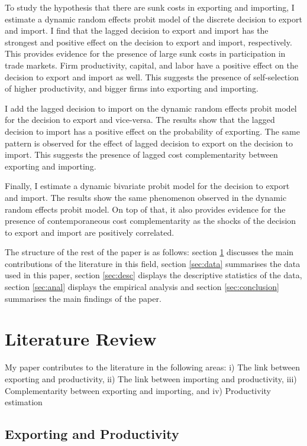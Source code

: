 \documentclass[12pt]{article}
\begin{document}
To study the hypothesis that there are  sunk costs in exporting
and importing, I estimate a dynamic random effects probit model of the discrete
decision to export and import. I find that the lagged decision to
export and import has the
 strongest and positive effect on the decision to export and
import, respectively.  This provides evidence for the presence of
large sunk costs in participation in trade markets. Firm productivity,
capital, and labor have a positive
effect on the decision to export and import as well. This suggests the
presence of self-selection of higher productivity, and bigger firms into exporting
and importing. 

I add the lagged decision to import on the dynamic random effects
probit model for the decision to export and vice-versa. The results show that the lagged
decision to import has a positive effect on the probability of
exporting. The same pattern is observed for the effect of lagged
decision to export on the decision to import. This suggests the
presence of lagged cost complementarity between exporting and
importing. 

Finally, I estimate a dynamic bivariate probit model for the decision to export
and import. The results show the same phenomenon observed in the
dynamic random effects probit model. On top of that, it also provides
evidence for the presence
of contemporaneous cost complementarity as the shocks of the decision
to export and import are positively correlated. 


The structure of the rest of the paper is as follows: section \ref{sec:lit} discusses
the main contributions of the literature in this field, section
\ref{sec:data} summarises the data used in this paper, section
\ref{sec:desc} displays the descriptive statistics of the data,
section \ref{sec:anal} displays the empirical analysis and section 
\ref{sec:conclusion} summarises the main findings of the paper. 


\section{Literature Review}\label{sec:lit}
My paper contributes to the literature in the following areas: 
i) The link between exporting and productivity,
ii) The link between importing and productivity, 
iii) Complementarity between exporting and importing,
and iv) Productivity estimation
\subsection*{Exporting and Productivity}
\end{document}
